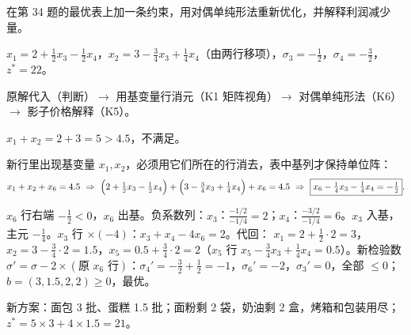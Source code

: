 在第 34 题的最优表上加一条约束，用对偶单纯形法重新优化，并解释利润减少量。\par
{}$x_1=2+\frac12x_3-\frac12x_4$，$x_2=3-\frac34x_3+\frac14x_4$（由两行移项），$\sigma_3=-\frac12$，$\sigma_4=-\frac32$，$z^*=22$。\par
{}原解代入（判断）$\to$ 用基变量行消元（K1 矩阵视角）$\to$ 对偶单纯形法（K6）$\to$ 影子价格解释（K5）。

$x_1+x_2=2+3=5>4.5$，不满足。

新行里出现基变量 $x_1,x_2$，必须用它们所在的行消去，表中基列才保持单位阵：
\[
x_1+x_2+x_6=4.5\ \Rightarrow\ \Bigl(2+\tfrac12x_3-\tfrac12x_4\Bigr)+\Bigl(3-\tfrac34x_3+\tfrac14x_4\Bigr)+x_6=4.5
\ \Rightarrow\ \boxed{x_6-\tfrac14x_3-\tfrac14x_4=-\tfrac12}.
\]

$x_6$ 行右端 $-\frac12<0$，$x_6$ 出基。负系数列：$x_3$：$\frac{-1/2}{-1/4}=2$；$x_4$：$\frac{-3/2}{-1/4}=6$。$x_3$ 入基，主元 $-\frac14$。$x_3$ 行 $\times(-4)$：$x_3+x_4-4x_6=2$。代回：
$x_1=2+\frac12\cdot2=3$，$x_2=3-\frac34\cdot2=1.5$，$x_5=0.5+\frac34\cdot2=2$（$x_5$ 行 $x_5-\frac34x_3+\frac14x_4=0.5$）。新检验数 $\sigma'=\sigma-2\times(\text{原 }x_6\text{ 行})$：$\sigma_4'=-\frac32+\frac12=-1$，$\sigma_6'=-2$，$\sigma_3'=0$，全部 $\le0$；$b=(3,1.5,2,2)\ge0$，最优。
\begin{figure}[!htbp]\centering
{}
\end{figure}

新方案：面包 3 批、蛋糕 1.5 批；面粉剩 2 袋，奶油剩 2 盒，烤箱和包装用尽；$z^*=5\times3+4\times1.5=21$。

